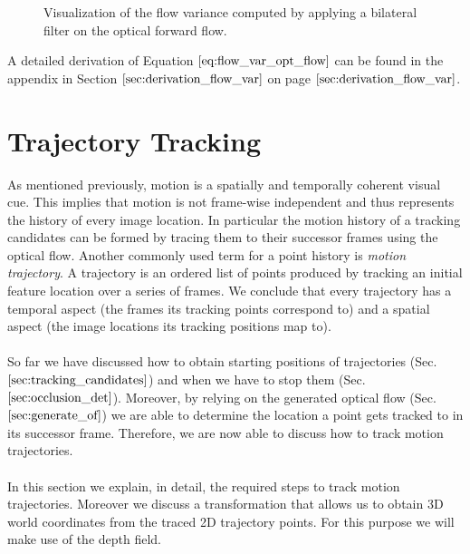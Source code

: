 \begin{figure}[H]
\begin{center}
\end{center}
\caption[Flow Variance]{Visualization of the flow variance computed by applying a bilateral filter on the optical forward flow.}
\label{fig:flow_variance}
\end{figure}
A detailed derivation of Equation $\ref{eq:flow_var_opt_flow}$ can be found in the appendix in Section $\ref{sec:derivation_flow_var}$ on page $\pageref{sec:derivation_flow_var}$.

\section{Trajectory Tracking}
\label{sec:trajectory_tracking}
As mentioned previously, motion is a spatially and temporally coherent visual cue. This implies that motion is not frame-wise independent and thus represents the history of every image location. In particular the motion history of a tracking candidates can be formed by tracing them to their successor frames using the optical flow. Another commonly used term for a point history is \textit{motion trajectory}. A trajectory is an ordered list of points produced by tracking an initial feature location over a series of frames. We conclude that every trajectory has a temporal aspect (the frames its tracking points correspond to) and a spatial aspect (the image locations its tracking positions map to). \\ \\
So far we have discussed how to obtain starting positions of trajectories (Sec. $\ref{sec:tracking_candidates}$) and when we have to stop them (Sec. $\ref{sec:occlusion_det}$). Moreover, by relying on the generated optical flow (Sec. $\ref{sec:generate_of}$) we are able to determine the location a point gets tracked to in its successor frame. Therefore, we are now able to discuss how to track motion trajectories. \\ \\
In this section we explain, in detail, the required steps to track motion trajectories. Moreover we discuss a transformation that allows us to obtain 3D world coordinates from the traced 2D trajectory points. For this purpose we will make use of the depth field.

